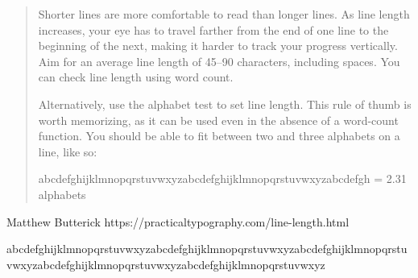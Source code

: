 \documentclass[11pt]{article}
\begin{document}

\begin{quote}
Shorter lines are more comfortable to read than longer lines. As line length
increases, your eye has to travel farther from the end of one line to the
beginning of the next, making it harder to track your progress vertically. Aim
for an average line length of 45–90 characters, including spaces. You can check
line length using word count.

Alternatively, use the alphabet test to set line length. This rule of thumb is worth memorizing, as it can be used even in the absence of a word-count function. You should be able to fit between two and three alphabets on a line, like so:

abcdefghijklmnopqrstuvwxyzabcdefghijklmnopqrstuvwxyzabcdefgh
= 2.31 alphabets
  \end{quote}
  Matthew Butterick
  https://practicaltypography.com/line-length.html


 \noindent abcdefghijklmnopqrstuvwxyzabcdefghijklmnopqrstuvwxyzabcdefghijklmnopqrstuvwxyzabcdefghijklmnopqrstuvwxyzabcdefghijklmnopqrstuvwxyz

\end{document}
